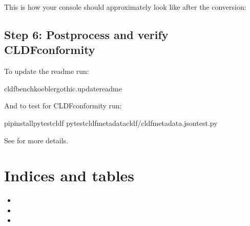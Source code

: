 \documentclass[letterpaper,10pt,english]{sphinxmanual}
\begin{document}
\sphinxAtStartPar
This is how your console should approximately look like after the conversion:

\noindent{}


\section{Step 6: Post\sphinxhyphen{}process and verify CLDF\sphinxhyphen{}conformity}
\label{\detokenize{mkcldf:step-6-post-process-and-verify-cldf-conformity}}
\sphinxAtStartPar
To update the readme run:

\begin{sphinxVerbatim}[commandchars=\\\{\}]
cldfbenchkoeblergothic.update\PYGZus{}readme
\end{sphinxVerbatim}

\sphinxAtStartPar
And to test for CLDF\sphinxhyphen{}conformity run:

\begin{sphinxVerbatim}[commandchars=\\\{\}]
pipinstallpytest\PYGZhy{}cldf
pytest\PYGZhy{}\PYGZhy{}cldf\PYGZhy{}metadatacldf/cldf\PYGZhy{}metadata.jsontest.py
\end{sphinxVerbatim}

\sphinxAtStartPar
See 
for more details.


\chapter{Indices and tables}
\label{\detokenize{index:indices-and-tables}}\begin{itemize}
\item {} 
\sphinxAtStartPar
{}

\item {} 
\sphinxAtStartPar
{}

\item {} 
\sphinxAtStartPar
{}

\end{itemize}
\end{document}
